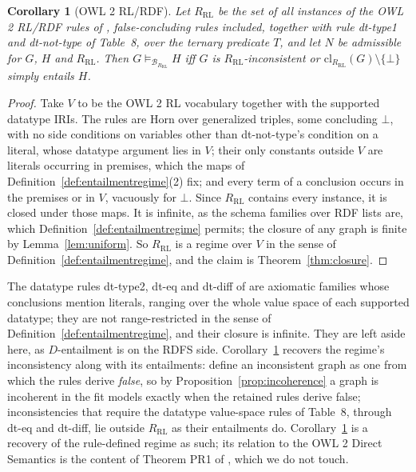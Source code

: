 \documentclass[12pt]{article}
\newtheorem{corollary}{Corollary}
\theoremstyle{definition}
\newcommand{\bmap}{\mathfrak{B}}  %
\newcommand{\Bcal}{\mathcal{B}}   %
\newcommand{\cl}{\mathrm{cl}}   %
\begin{document}
\begin{corollary}[OWL 2 RL/RDF]
\label{cor:owlrl}
Let $R_{\mathrm{RL}}$ be the set of all instances of the OWL 2 RL/RDF rules of \citet[Tables~4--7 and~9]{motik2012owl}, false-concluding rules included, together with rule dt-type1 and dt-not-type of Table~8, over the ternary predicate $T$, and let $N$ be admissible for $G$, $H$ and $R_{\mathrm{RL}}$. Then $G \models_{\Bcal_{R_{\mathrm{RL}}}} H$ iff $G$ is $R_{\mathrm{RL}}$-inconsistent or $\cl_{R_{\mathrm{RL}}}(G) \setminus \{\bot\}$ simply entails $H$.
\end{corollary}

\begin{proof}
Take $V$ to be the OWL 2 RL vocabulary together with the supported datatype IRIs. The rules are Horn over generalized triples, some concluding $\bot$, with no side conditions on variables other than dt-not-type's condition on a literal, whose datatype argument lies in $V$; their only constants outside $V$ are literals occurring in premises, which the maps of Definition~\ref{def:entailmentregime}(2) fix; and every term of a conclusion occurs in the premises or in $V$, vacuously for $\bot$. Since $R_{\mathrm{RL}}$ contains every instance, it is closed under those maps. It is infinite, as the schema families over RDF lists are, which Definition~\ref{def:entailmentregime} permits; the closure of any graph is finite by Lemma~\ref{lem:uniform}. So $R_{\mathrm{RL}}$ is a regime over $V$ in the sense of Definition~\ref{def:entailmentregime}, and the claim is Theorem~\ref{thm:closure}.
\end{proof}

The datatype rules dt-type2, dt-eq and dt-diff of \citet[Table~8]{motik2012owl} are axiomatic families whose conclusions mention literals, ranging over the whole value space of each supported datatype; they are not range-restricted in the sense of Definition~\ref{def:entailmentregime}, and their closure is infinite. They are left aside here, as $D$-entailment is on the RDFS side.
Corollary~\ref{cor:owlrl} recovers the regime's inconsistency along with its entailments: \citet{motik2012owl} define an inconsistent graph as one from which the rules derive \emph{false}, so by Proposition~\ref{prop:incoherence} a graph is incoherent in the fit models exactly when the retained rules derive false; inconsistencies that require the datatype value-space rules of Table~8, through dt-eq and dt-diff, lie outside $R_{\mathrm{RL}}$ as their entailments do.
Corollary~\ref{cor:owlrl} is a recovery of the rule-defined regime as such; its relation to the OWL 2 Direct Semantics is the content of Theorem PR1 of \citet{motik2012owl}, which we do not touch.
\end{document}
